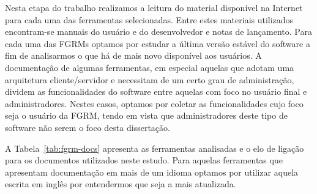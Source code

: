 Nesta etapa do trabalho realizamos a leitura do material disponível na Internet
para cada uma das ferramentas selecionadas. Entre estes materiais utilizados
encontram-se manuais do usuário e do desenvolvedor e notas de lançamento. Para
cada uma das FGRMs optamos por estudar a última versão estável do software a fim
de analisarmos o que há de mais novo disponível aos usuários. A documentação de
algumas ferramentas, em especial aquelas que adotam uma arquitetura
cliente/servidor e necessitam de um certo grau de administração, dividem as
funcionalidades do software entre aquelas com foco no usuário final e
ad\-mi\-nis\-tra\-do\-res. Nestes casos, optamos por coletar as funcionalidades
cujo foco seja o usuário da FGRM, tendo em vista que administradores deste tipo
de software não serem o foco desta dissertação.

A Tabela~\ref{tab:fgrm-docs} apresenta as ferramentas analisadas e o elo de
ligação para os documentos utilizados neste estudo. Para aquelas ferramentas que
apresentam documentação em mais de um i\-di\-o\-ma optamos por utilizar aquela
escrita em inglês por entendermos que seja a mais atualizada.

